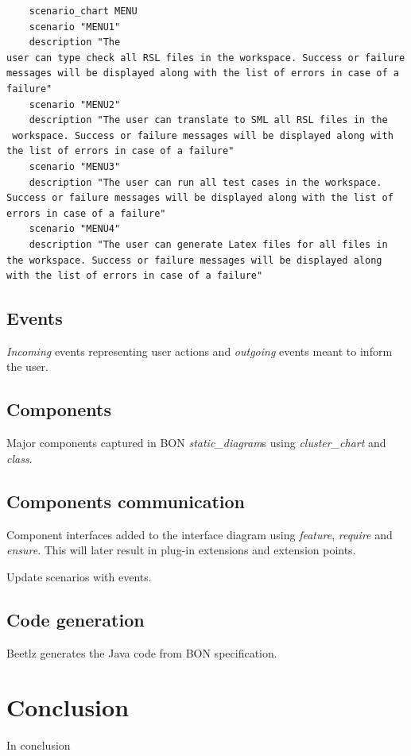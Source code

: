 \documentclass[conference]{IEEEtran}
\begin{document}
\begin{verbatim} 
	scenario_chart MENU 
	scenario "MENU1" 
	description "The
user can type check all RSL files in the workspace. Success or failure
messages will be displayed along with the list of errors in case of a
failure" 
	scenario "MENU2" 
	description "The user can translate to SML all RSL files in the
 workspace. Success or failure messages will be displayed along with
the list of errors in case of a failure" 
	scenario "MENU3" 
	description "The user can run all test cases in the workspace.
Success or failure messages will be displayed along with the list of
errors in case of a failure" 
	scenario "MENU4" 
	description "The user can generate Latex files for all files in
the workspace. Success or failure messages will be displayed along
with the list of errors in case of a failure" 
\end{verbatim}


%
\subsection{Events}
\emph{Incoming} events representing user actions and \emph{outgoing} events meant to inform the user.


%
\subsection{Components}
Major components captured in BON \emph{static\_diagram}s using \emph{cluster\_chart} and \emph{class}.


%
\subsection{Components communication}
Component interfaces added to the interface diagram using  \emph{feature}, \emph{require} and \emph{ensure}. This will later result in plug-in extensions and extension points.


Update scenarios with events.

%
\subsection{Code generation}
Beetlz generates the Java code from BON specification.

\section{Conclusion}
In conclusion
\end{document}
